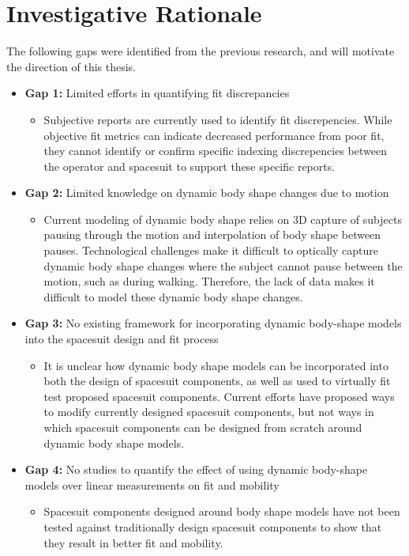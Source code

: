 \documentclass[defaultstyle,11pt]{comps}
\providecommand{\tightlist}{%
  \setlength{\itemsep}{0pt}\setlength{\parskip}{0pt}}
\begin{document}
\hypertarget{investigative-rationale}{%
\chapter{Investigative Rationale}\label{investigative-rationale}}

The following gaps were identified from the previous research, and will motivate the direction of this thesis.

\begin{itemize}
\tightlist
\item
  \textbf{Gap 1: }Limited efforts in quantifying fit discrepancies

  \begin{itemize}
  \tightlist
  \item
    Subjective reports are currently used to identify fit discrepencies. While objective fit metrics can indicate decreased performance from poor fit, they cannot identify or confirm specific indexing discrepencies between the operator and spacesuit to support these specific reports.
  \end{itemize}
\item
  \textbf{Gap 2: } Limited knowledge on dynamic body shape changes due to motion

  \begin{itemize}
  \tightlist
  \item
    Current modeling of dynamic body shape relies on 3D capture of subjects pausing through the motion and interpolation of body shape between pauses. Technological challenges make it difficult to optically capture dynamic body shape changes where the subject cannot pause between the motion, such as during walking. Therefore, the lack of data makes it difficult to model these dynamic body shape changes.
  \end{itemize}
\item
  \textbf{Gap 3: } No existing framework for incorporating dynamic body-shape models into the spacesuit design and fit process

  \begin{itemize}
  \tightlist
  \item
    It is unclear how dynamic body shape models can be incorporated into both the design of spacesuit components, as well as used to virtually fit test proposed spacesuit components. Current efforts have proposed ways to modify currently designed spacesuit components, but not ways in which spacesuit components can be designed from scratch around dynamic body shape models.
  \end{itemize}
\item
  \textbf{Gap 4: } No studies to quantify the effect of using dynamic body-shape models over linear measurements on fit and mobility

  \begin{itemize}
  \tightlist
  \item
    Spacesuit components designed around body shape models have not been tested against traditionally design spacesuit components to show that they result in better fit and mobility.
  \end{itemize}
\end{itemize}
\end{document}
